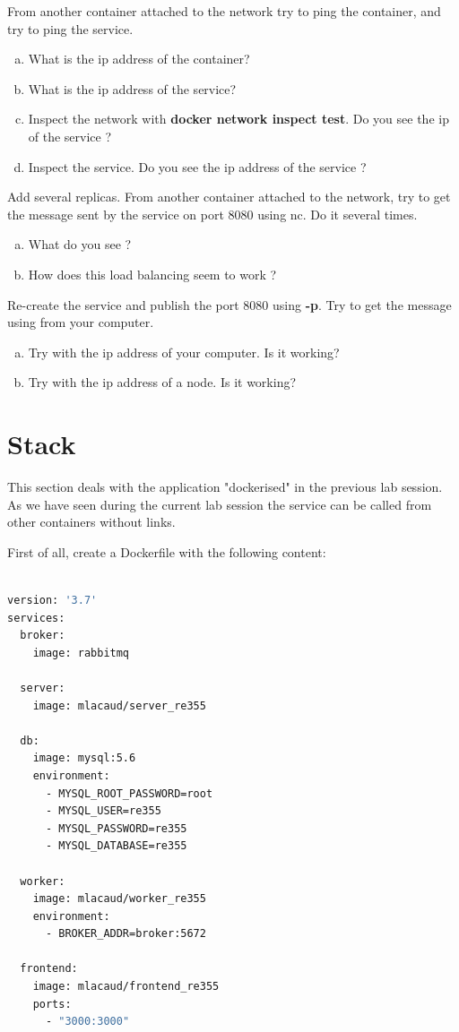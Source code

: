 \documentclass[a4paper,11pt]{exam}
\begin{document}
\begin{questions}
	\question From another container attached to the network try to ping the container, and try to ping the service.
	\begin{enumerate}[(a)]
		\item What is the ip address of the container?
		\item What is the ip address of the service?
		\item Inspect the network with \textbf{docker network inspect test}. Do you see the ip of the service ?
		\item Inspect the service. Do you see the ip address of the service ?
	\end{enumerate}

	\question Add several replicas. From another container attached to the network, try to get the message sent by the service on port 8080 using nc. Do it several times.
	\begin{enumerate}[(a)]
		\item What do you see ?
		\item How does this load balancing seem to work ?
	\end{enumerate}

	\question Re-create the service and publish the port 8080 using \textbf{-p}. Try to get the message using from your computer.
	\begin{enumerate}[(a)]
		\item Try with the ip address of your computer. Is it working?
		\item Try with the ip address of a node. Is it working?
	\end{enumerate}
\end{questions}


\section{Stack}

This section deals with the application "dockerised" in the previous lab session. As we have seen during the current lab session the service can be called from other containers without links.

First of all, create a Dockerfile with the following content:


\begin{lstlisting}[frame=single,language={sh}]  % Start your code-block

version: '3.7'
services:
  broker:
    image: rabbitmq

  server:
    image: mlacaud/server_re355

  db:
    image: mysql:5.6
    environment:
      - MYSQL_ROOT_PASSWORD=root
      - MYSQL_USER=re355
      - MYSQL_PASSWORD=re355
      - MYSQL_DATABASE=re355

  worker:
    image: mlacaud/worker_re355
    environment:
      - BROKER_ADDR=broker:5672

  frontend:
    image: mlacaud/frontend_re355
    ports:
      - "3000:3000"
\end{lstlisting}
\end{document}
